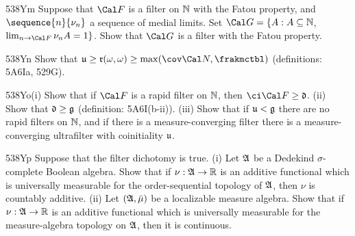 {\spheader 538Ym
Suppose that $\Cal F$ is a filter on $\Bbb N$ with the Fatou property, and
$\sequence{n}{\nu_n}$ a sequence of medial limits.   Set
$\Cal G=\{A:A\subseteq\Bbb N$, $\lim_{n\to\Cal F}\nu_nA=1\}$.   Show that
$\Cal G$ is a filter with the Fatou property.

\spheader 538Yn Show that
$\frak u\ge\frak r(\omega,\omega)\ge\max(\cov\Cal N,\frakmctbl)$
(definitions:  5A6Ia, 529G).

\spheader 538Yo(i) Show that if $\Cal F$ is a rapid filter
on $\Bbb N$, then
$\ci\Cal F\ge\frak d$.   (ii) Show that $\frak d\ge\frak g$ (definition:
5A6I(b-ii)).   (iii) Show that if $\frak u<\frak g$ there are no rapid
filters on $\Bbb N$, and if there is a measure-converging filter
there is a measure-converging ultrafilter with coinitiality $\frak u$.

\spheader 538Yp Suppose that the filter dichotomy is true.
(i) Let $\frak A$ be a Dedekind $\sigma$-complete
Boolean algebra.   Show that if $\nu:\frak A\to\Bbb R$ is an additive
functional which is universally measurable for the order-sequential
topology of $\frak A$, then
$\nu$ is countably additive.   (ii) Let $(\frak A,\bar\mu)$ be a
localizable measure algebra.   Show that if $\nu:\frak A\to\Bbb R$ is an
additive functional which is universally measurable for the measure-algebra
topology on $\frak A$, then it is continuous.

}
